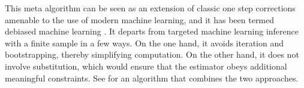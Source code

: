 This meta algorithm can be seen as an extension of classic one step corrections \cite{pfanzagl1982lecture} amenable to the use of modern machine learning, and it has been termed debiased machine learning \cite{chernozhukov2018original}. It departs from targeted machine learning inference with a finite sample \cite{van2017finite,cai2020nonparametric} in a few ways. On the one hand, it avoids iteration and bootstrapping, thereby simplifying computation. On the other hand, it does not involve substitution, which would ensure that the estimator obeys additional meaningful constraints. See \cite{chernozhukov2018learning} for an algorithm that combines the two approaches.